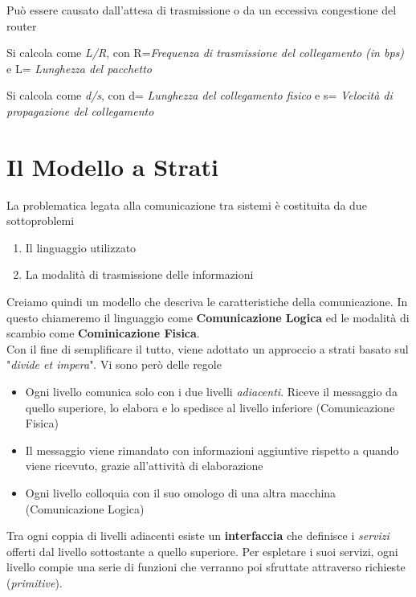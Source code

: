 \documentclass{article}
\newcounter{subsubsubsection}[subsubsection]
\begin{document}
                    Può essere causato dall'attesa di trasmissione o da un eccessiva congestione del router

                    Si calcola come \textit{L/R}, con R=\textit{Frequenza di trasmissione del collegamento (in bps)} e L= \textit{Lunghezza del pacchetto}

                    Si calcola come \textit{d/s}, con d= \textit{Lunghezza del collegamento fisico} e s= \textit{Velocità di propagazione del collegamento}

\newpage                    
    \section{Il Modello a Strati}
        La problematica legata alla comunicazione tra sistemi è costituita da due sottoproblemi
        \begin{enumerate}
            \item Il linguaggio utilizzato
            \item La modalità di trasmissione delle informazioni
        \end{enumerate}               
        Creiamo quindi un modello che descriva le caratteristiche della comunicazione. In questo chiameremo il linguaggio come \textbf{Comunicazione Logica} ed le modalità di scambio come \textbf{Cominicazione Fisica}.\\
        Con il fine di semplificare il tutto, viene adottato un approccio a strati basato sul "\textit{divide et impera}". Vi sono però delle regole
        \begin{itemize}
            \item Ogni livello comunica solo con i due livelli \textit{adiacenti}. Riceve il messaggio da quello superiore, lo elabora e lo spedisce al livello inferiore (Comunicazione Fisica)
            \item Il messaggio viene rimandato con informazioni aggiuntive rispetto a quando viene ricevuto, grazie all'attività di elaborazione
            \item Ogni livello colloquia con il suo omologo di una altra macchina (Comunicazione Logica) 
        \end{itemize}
        Tra ogni coppia di livelli adiacenti esiste un \textbf{interfaccia} che definisce i \textit{servizi} offerti dal livello sottostante a quello superiore. Per espletare i suoi servizi, ogni livello compie una serie di funzioni che verranno poi sfruttate attraverso richieste (\textit{primitive}).\\
\end{document}
